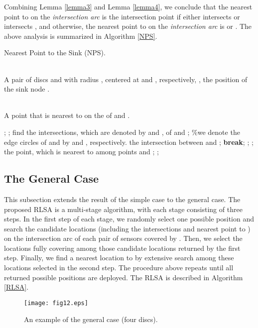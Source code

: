 \documentclass[journal]{IEEEtran}
\begin{document}
Combining Lemma \ref{lemma3} and Lemma \ref{lemma4}, we conclude that the nearest point to  on the \emph{intersection arc} is the intersection point if either  intersects  or  intersects , and otherwise, the nearest point to  on the \emph{intersection arc} is  or . The above analysis is summarized in Algorithm \ref{NPS}.

\begin{algorithm}[htb]         \caption{Nearest Point to the Sink (NPS).}             
\label{NPS}                  
\begin{algorithmic}[1]                
\REQUIRE ~~\\                          
   A pair of discs  and  with radius , centered at  and , respectively, , the position of the sink node .

\ENSURE ~~\\                           
    A point  that is nearest to  on the  of  and .

\STATE ;
\STATE ;
\STATE find the intersections, which are denoted by  and , of  and ; \%we denote the edge circles of  and  by  and ,
respectively.
\WHILE{}
    \STATE the intersection between  and ;
        \STATE \textbf{break};
    \ENDIF
    \STATE ;
    \STATE ;
\ENDWHILE
\IF{()}
    \STATE  the point, which is nearest to  among points  and ;
\ENDIF
\RETURN ;                \end{algorithmic}

\end{algorithm}

\subsection{The General Case}
This subsection extends the result of the simple case to the general case. The proposed RLSA is a multi-stage algorithm, with each stage consisting of three steps. In the first step of each stage, we randomly select one possible position  and search the candidate locations (including the intersections and nearest point to ) on the intersection arc of each pair of sensors covered by . Then, we select the locations fully covering  among those candidate locations returned by the first step. Finally, we find a nearest location to  by extensive search among these locations selected in the second step. The procedure above repeats until all returned possible positions are deployed. The RLSA is described in Algorithm \ref{RLSA}.


\begin{figure}
\begin{center}
\texttt{[image: fig12.eps]}    \caption{An example of the general case (four discs).}
\label{fig12}                                 \end{center}                                 \end{figure}
\end{document}
